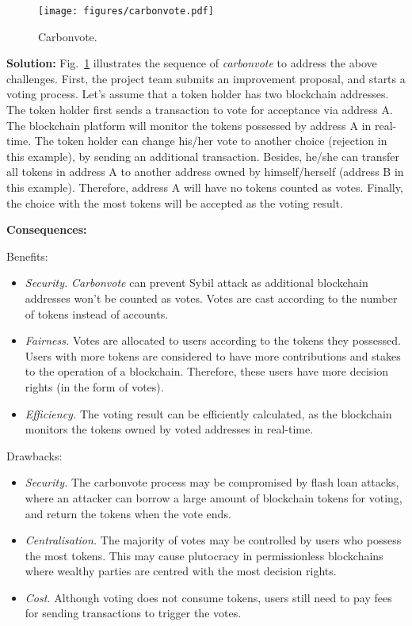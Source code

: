 \documentclass{article}
\begin{document}
\begin{figure}[!ht]
	\centering
	\texttt{[image: figures/carbonvote.pdf]}
	\caption{Carbonvote.}
	\label{pic:Carbonvote}
\end{figure}

\vspace{0.5em}\noindent \textbf{Solution:} Fig.~\ref{pic:Carbonvote} illustrates the sequence of \textit{carbonvote} to address the above challenges. First, the project team submits an improvement proposal, and starts a voting process. Let's assume that a token holder has two blockchain addresses. The token holder first sends a transaction to vote for acceptance via address A. The blockchain platform will monitor the tokens possessed by address A in real-time. The token holder can change his/her vote to another choice (rejection in this example), by sending an additional transaction. Besides, he/she can transfer all tokens in address A to another address owned by himself/herself (address B in this example). Therefore, address A will have no tokens counted as votes. Finally, the choice with the most tokens will be accepted as the voting result.


\vspace{0.5em}\noindent \textbf{Consequences:} 

Benefits:
\begin{itemize}
  \item \textit{Security.} \textit{Carbonvote} can prevent Sybil attack as additional blockchain addresses won't be counted as votes. Votes are cast according to the number of tokens instead of accounts.
  
  \item \textit{Fairness.} Votes are allocated to users according to the tokens they possessed. Users with more tokens are considered to have more contributions and stakes to the operation of a blockchain. Therefore, these users have more decision rights (in the form of votes).
  
  \item \textit{Efficiency.} The voting result can be efficiently calculated, as the blockchain monitors the tokens owned by voted addresses in real-time.
\end{itemize}

Drawbacks:
\begin{itemize}
  \item \textit{Security.} The carbonvote process may be compromised by flash loan attacks, where an attacker can borrow a large amount of blockchain tokens for voting, and return the tokens when the vote ends.

  \item \textit{Centralisation.} The majority of votes may be controlled by users who possess the most tokens. This may cause plutocracy in permissionless blockchains where wealthy parties are centred with the most decision rights.
  
  \item \textit{Cost.} Although voting does not consume tokens, users still need to pay fees for sending transactions to trigger the votes.
\end{itemize}
\end{document}
